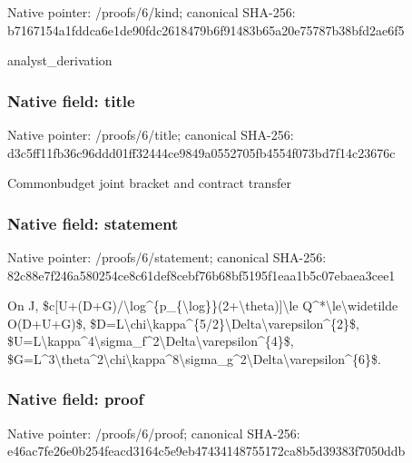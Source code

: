 \documentclass[10pt,a4paper]{article}
\begin{document}
Native pointer: /proofs/6/kind; canonical SHA-256: b7167154a1fddca6e1de90fd\allowbreak{}c2618479b6f91483b65a20e7\allowbreak{}5787b38bfd2ae6f5


analyst\_derivation


\subsubsection{Native field: title}


Native pointer: /proofs/6/title; canonical SHA-256: d3c5ff11fb36c96ddd01ff32\allowbreak{}444ce9849a0552705fb4554f\allowbreak{}073bd7f14c23676c


Commonbudget joint bracket and contract transfer


\subsubsection{Native field: statement}


Native pointer: /proofs/6/statement; canonical SHA-256: 82c88e7f246a580254ce8c61\allowbreak{}def8cebf76b68bf5195f1eaa\allowbreak{}1b5c07ebaea3cee1


On J, \$c[U+(D+G)/\textbackslash{}log\textasciicircum{}\{p\_\{\textbackslash{}log\allowbreak{}\}\}(2+\textbackslash{}theta)]\textbackslash{}le Q\textasciicircum{}*\textbackslash{}le\textbackslash{}widetilde O(D+U+G)\$, \$D=L\textbackslash{}chi\textbackslash{}kappa\textasciicircum{}\{5/2\}\textbackslash{}Del\allowbreak{}ta\textbackslash{}varepsilon\textasciicircum{}\{2\}\$, \$U=L\textbackslash{}kappa\textasciicircum{}4\textbackslash{}sigma\_f\textasciicircum{}2\textbackslash{}D\allowbreak{}elta\textbackslash{}varepsilon\textasciicircum{}\{4\}\$, \$G=L\textasciicircum{}3\textbackslash{}theta\textasciicircum{}2\textbackslash{}chi\textbackslash{}kappa\allowbreak{}\textasciicircum{}8\textbackslash{}sigma\_g\textasciicircum{}2\textbackslash{}Delta\textbackslash{}varep\allowbreak{}silon\textasciicircum{}\{6\}\$.


\subsubsection{Native field: proof}


Native pointer: /proofs/6/proof; canonical SHA-256: e46ac7fe26e0b254feacd316\allowbreak{}4c5e9eb47434148755172ca8\allowbreak{}b5d39383f7050ddb
\end{document}
